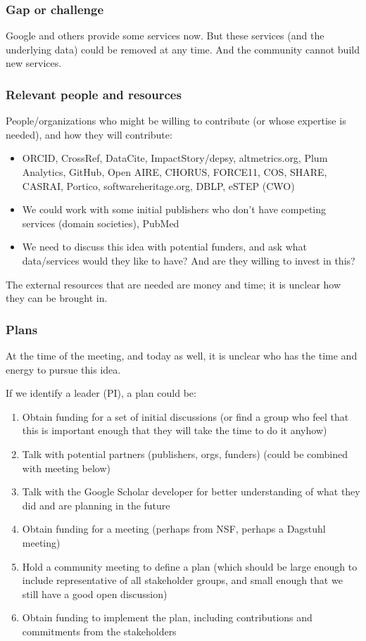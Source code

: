 \subsubsection{Gap or challenge}

Google and others provide some services now.
But these services (and the underlying data) could be removed at any time.
And the community cannot build new services.

\subsubsection{Relevant people and resources}

People/organizations who might be willing to contribute (or whose expertise is needed), and how they will contribute:

\begin{itemize}
\item ORCID, CrossRef, DataCite, ImpactStory/depsy, altmetrics.org, Plum Analytics, GitHub, Open AIRE, CHORUS, FORCE11, COS, SHARE, CASRAI, Portico, softwareheritage.org, DBLP, eSTEP (CWO)
\item We could work with some initial publishers who don't have competing services (domain societies), PubMed
\item We need to discuss this idea with potential funders, and ask what data/services would they like to have?  And are they willing to invest in this?
\end{itemize}

The external resources that are needed are money and time; it is unclear how they can be brought in.

\subsubsection{Plans}

At the time of the meeting, and today as well, it is unclear who has the time and energy to pursue this idea.

If we identify a leader (PI), a plan could be:
\begin{enumerate}
\item Obtain funding for a set of initial discussions (or find a group who feel that this is important enough that they will take the time to do it anyhow)
\item Talk with potential partners (publishers, orgs, funders) (could be combined with meeting below)
\item Talk with the Google Scholar developer for better understanding of what they did and are planning in the future
\item Obtain funding for a meeting (perhaps from NSF, perhaps a Dagstuhl meeting)
\item Hold a community meeting to define a plan (which should be large enough to include representative of all stakeholder groups, and small enough that we still have a good open discussion)
\item Obtain funding to implement the plan, including contributions and commitments from the stakeholders
\end{enumerate}

